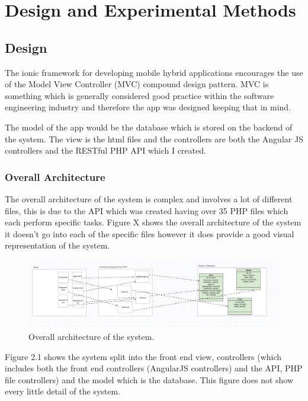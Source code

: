 \chapter{Design and Experimental Methods}
\section{Design}
The ionic framework for developing mobile hybrid applications encourages the use of the Model View Controller (MVC) compound design pattern. MVC is something which is generally considered good practice within the software engineering industry and therefore the app was designed keeping that in mind.

The model of the app would be the database which is stored on the backend of the system. The view is the html files and the controllers are both the Angular JS controllers and the RESTful PHP API which I created.

\subsection{Overall Architecture}
The overall architecture of the system is complex and involves a lot of different files, this is due to the API which was created having over 35 PHP files which each perform specific tasks. Figure X shows the overall architecture of the system it doesn't go into each of the specific files however it does provide a good visual representation of the system.

\begin{figure}
\includegraphics[width=\textwidth,height=\textheight,keepaspectratio]{images/overall}
\caption{Overall architecture of the system.}
\end{figure}



Figure 2.1 shows the system split into the front end view, controllers (which includes both the front end controllers (AngularJS controllers) and the API, PHP file controllers) and the model which is the database. This figure does not show every little detail of the system.


